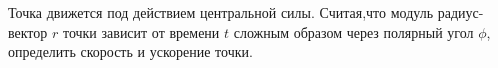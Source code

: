 Точка движется под действием центральной силы. Считая,что модуль радиус-вектор $r$ точки зависит от времени $t$ сложным
образом через полярный угол $\phi$, определить скорость и ускорение точки.
